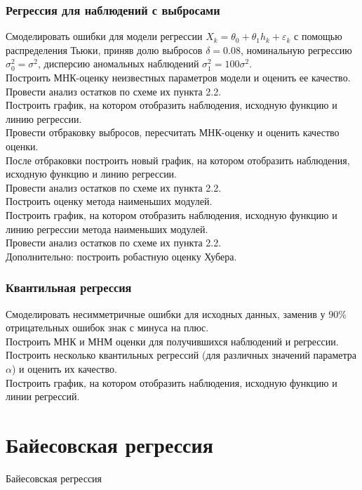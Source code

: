 \documentclass[a4paper,12pt]{article}
\begin{document}
\subsubsection{Регрессия для наблюдений с выбросами}

Смоделировать ошибки для модели регрессии $X_k = \theta_0 + \theta_1 h_k + \varepsilon_k$ с помощью распределения Тьюки, приняв долю выбросов $\delta = 0.08$, номинальную регрессию $\sigma_0^2 = \sigma^2$, дисперсию аномальных наблюдений $\sigma_1^2 = 100\sigma^2$.\\
Построить МНК-оценку неизвестных параметров модели и оценить ее качество.\\
Провести анализ остатков по схеме их пункта 2.2.\\
Построить график, на котором отобразить наблюдения, исходную функцию и линию регрессии.\\
Провести отбраковку выбросов, пересчитать МНК-оценку и оценить качество оценки.\\
После отбраковки построить новый график, на котором отобразить наблюдения, исходную функцию и линию регрессии.\\
Провести анализ остатков по схеме их пункта 2.2.\\
Построить оценку метода наименьших модулей.\\
Построить график, на котором отобразить наблюдения, исходную функцию и линию регрессии метода наименьших модулей.\\
Провести анализ остатков по схеме их пункта 2.2.\\
Дополнительно: построить робастную оценку Хубера.



\subsubsection{Квантильная регрессия}

Смоделировать несимметричные ошибки для исходных данных, заменив у $90\%$ отрицательных ошибок знак с минуса на плюс.\\
Построить МНК и МНМ оценки для получившихся наблюдений и регрессии.\\
Построить несколько квантильных регрессий (для различных значений параметра $\alpha$) и оценить их качество.\\
Построить график, на котором отобразить наблюдения, исходную функцию и линии регрессий.\\


\section{Байесовская регрессия}
Байесовская регрессия\\
\end{document}
